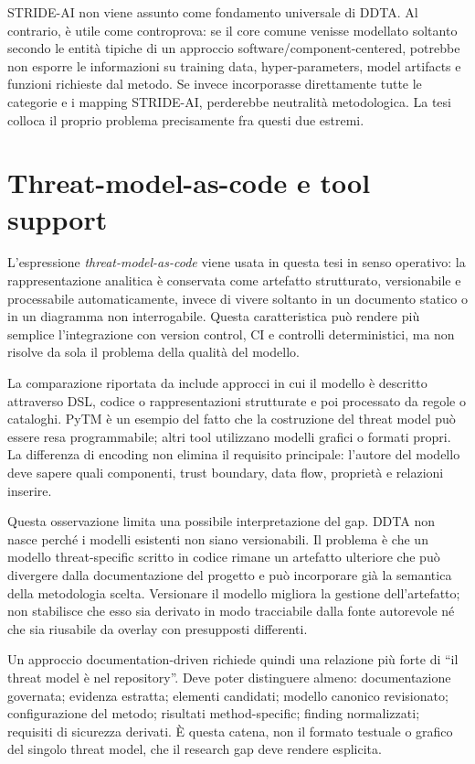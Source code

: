 \documentclass[12pt,a4paper,oneside]{report}
\begin{document}
STRIDE-AI non viene assunto come fondamento universale di DDTA. Al contrario, è utile come controprova: se il core comune venisse modellato soltanto secondo le entità tipiche di un approccio software/component-centered, potrebbe non esporre le informazioni su training data, hyper-parameters, model artifacts e funzioni richieste dal metodo. Se invece incorporasse direttamente tutte le categorie e i mapping STRIDE-AI, perderebbe neutralità metodologica. La tesi colloca il proprio problema precisamente fra questi due estremi.

\section{Threat-model-as-code e tool support}

L'espressione \textit{threat-model-as-code} viene usata in questa tesi in senso operativo: la rappresentazione analitica è conservata come artefatto strutturato, versionabile e processabile automaticamente, invece di vivere soltanto in un documento statico o in un diagramma non interrogabile. Questa caratteristica può rendere più semplice l'integrazione con version control, CI e controlli deterministici, ma non risolve da sola il problema della qualità del modello.

La comparazione riportata da \citet{granata2024automatedthreatmodelling} include approcci in cui il modello è descritto attraverso DSL, codice o rappresentazioni strutturate e poi processato da regole o cataloghi. PyTM è un esempio del fatto che la costruzione del threat model può essere resa programmabile; altri tool utilizzano modelli grafici o formati propri. La differenza di encoding non elimina il requisito principale: l'autore del modello deve sapere quali componenti, trust boundary, data flow, proprietà e relazioni inserire.

Questa osservazione limita una possibile interpretazione del gap. DDTA non nasce perché i modelli esistenti non siano versionabili. Il problema è che un modello threat-specific scritto in codice rimane un artefatto ulteriore che può divergere dalla documentazione del progetto e può incorporare già la semantica della metodologia scelta. Versionare il modello migliora la gestione dell'artefatto; non stabilisce che esso sia derivato in modo tracciabile dalla fonte autorevole né che sia riusabile da overlay con presupposti differenti.

Un approccio documentation-driven richiede quindi una relazione più forte di ``il threat model è nel repository''. Deve poter distinguere almeno: documentazione governata; evidenza estratta; elementi candidati; modello canonico revisionato; configurazione del metodo; risultati method-specific; finding normalizzati; requisiti di sicurezza derivati. È questa catena, non il formato testuale o grafico del singolo threat model, che il research gap deve rendere esplicita.
\end{document}
